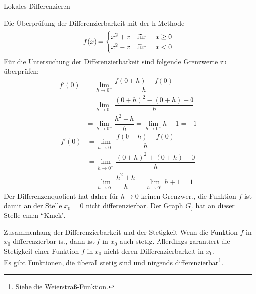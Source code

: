 \begin{section}{Lokales Differenzieren}
\begin{bsp*}{Die Überprüfung der Differenzierbarkeit mit der h-Methode}
$$f(x)= \begin{cases}
              x^2 + x & \text{für}\hspace{0.5cm} x\geq 0\\
              x^2 - x & \text{für}\hspace{0.5cm}  x< 0 
         \end{cases}$$
Für die Untersuchung der Differenzierbarkeit sind folgende Grenzwerte zu überprüfen:
\begin{equation*}
\begin{split}
f'(0) &= \lim_{h\rightarrow0^-} \dfrac{f(0+h)-f(0)}{h}\\ &=\lim_{h\rightarrow 0^-} \dfrac{(0+h)^2 - (0+h) -0}{h}\\ &= \lim_{h\rightarrow 0^-} \dfrac{h^2-h}{h} = \lim_{h\rightarrow 0^-} h-1=-1 
\end{split}
\end{equation*}
\begin{equation*}
\begin{split}
f'(0)&=\lim_{h\rightarrow 0^+}\dfrac{f(0+h)-f(0)}{h}\\
&=\lim_{h\rightarrow 0^+} \dfrac{(0+h)^2 + (0+h) -0}{h}\\ 
&=\lim_{h\rightarrow 0^+} \dfrac{h^2 + h}{h} = \lim_{h\rightarrow 0^+} h+1 =1
\end{split}
\end{equation*}
Der Differenzenquotient hat daher für $h\rightarrow 0$ keinen Grenzwert, die Funktion $f$ ist damit an der Stelle $x_0 = 0$ nicht differenzierbar. Der Graph $G_f$ hat an dieser Stelle einen "`Knick"'.
\end{bsp*}
\begin{b8d}{Zusammenhang der Differenzierbarkeit und der Stetigkeit}{}
Wenn die Funktion \(f\) in \(x_0\) differenzierbar ist, dann ist \(f\) in \(x_0\) auch stetig. Allerdings garantiert die Stetigkeit einer Funktion \(f\) in \(x_0\) nicht deren Differenzierbarkeit in \(x_0\). \\
Es gibt Funktionen, die überall stetig sind und nirgends differenzierbar\footnote{Siehe die Weierstraß-Funktion.}.
\end{b8d}

\end{section}
